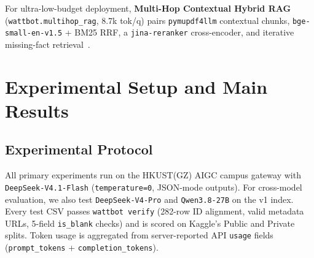 \documentclass[sigconf,nonacm]{acmart}
\newcommand{\code}[1]{\texttt{\small #1}}
\begin{document}
For ultra-low-budget deployment, \textbf{Multi-Hop Contextual Hybrid RAG} (\code{wattbot.multihop\_rag}, 8.7k tok/q) pairs \code{pymupdf4llm} contextual chunks, \code{bge-small-en-v1.5} + BM25 RRF, a \code{jina-reranker} cross-encoder, and iterative missing-fact retrieval~\cite{yeh2026kohakurag}.

\section{Experimental Setup and Main Results}
\label{sec:experiments}

\subsection{Experimental Protocol}
All primary experiments run on the HKUST(GZ) AIGC campus gateway with \code{DeepSeek-V4.1-Flash} (\code{temperature=0}, JSON-mode outputs). For cross-model evaluation, we also test \code{DeepSeek-V4-Pro} and \code{Qwen3.8-27B} on the v1 index. Every test CSV passes \code{wattbot verify} (282-row ID alignment, valid metadata URLs, 5-field \code{is\_blank} checks) and is scored on Kaggle's Public and Private splits. Token usage is aggregated from server-reported API \code{usage} fields (\code{prompt\_tokens} + \code{completion\_tokens}).
\end{document}
